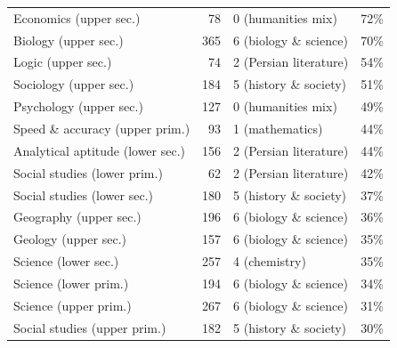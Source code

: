 \begin{longtable}{lrlr}
Economics (upper sec.) & 78 & 0 (humanities mix) & 72\% \\
Biology (upper sec.) & 365 & 6 (biology \& science) & 70\% \\
Logic (upper sec.) & 74 & 2 (Persian literature) & 54\% \\
Sociology (upper sec.) & 184 & 5 (history \& society) & 51\% \\
Psychology (upper sec.) & 127 & 0 (humanities mix) & 49\% \\
Speed \& accuracy (upper prim.) & 93 & 1 (mathematics) & 44\% \\
Analytical aptitude (lower sec.) & 156 & 2 (Persian literature) & 44\% \\
Social studies (lower prim.) & 62 & 2 (Persian literature) & 42\% \\
Social studies (lower sec.) & 180 & 5 (history \& society) & 37\% \\
Geography (upper sec.) & 196 & 6 (biology \& science) & 36\% \\
Geology (upper sec.) & 157 & 6 (biology \& science) & 35\% \\
Science (lower sec.) & 257 & 4 (chemistry) & 35\% \\
Science (lower prim.) & 194 & 6 (biology \& science) & 34\% \\
Science (upper prim.) & 267 & 6 (biology \& science) & 31\% \\
Social studies (upper prim.) & 182 & 5 (history \& society) & 30\% \\
\bottomrule
\end{longtable}

